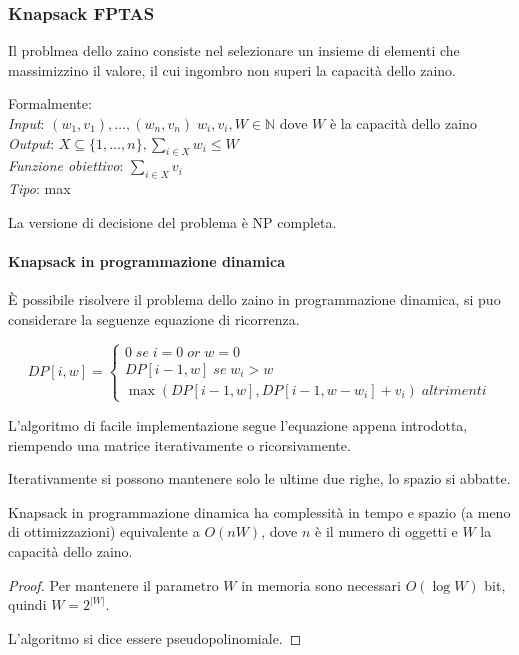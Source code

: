 \subsubsection{Knapsack FPTAS}
Il problmea dello zaino consiste nel selezionare un insieme 
di elementi che massimizzino il valore, il cui ingombro non superi
la capacità dello zaino.

Formalmente:\\
\emph{Input}: $(w_1, v_1), \dots, (w_n, v_n)\;w_i, v_i, W \in \mathbb{N}$ dove $W$ è la capacità dello zaino\\
\emph{Output}: $X \subseteq \{1, \dots, n\}, \sum_{i \in X} w_i \leq W$\\
\emph{Funzione obiettivo}: $\sum_{i \in X} v_i$\\
\emph{Tipo}: max

La versione di decisione del problema è NP completa.

\paragraph{Knapsack in programmazione dinamica}
È possibile risolvere il problema dello zaino in programmazione dinamica, 
si puo considerare la seguenze equazione di ricorrenza.

\[
    DP[i,w] = 
    \begin{cases}
        0\; \mathit{se}\; i = 0\;\mathit{or}\;w = 0\\
        DP[i-1,w]\;\mathit{se}\;w_i > w\\
        \max(DP[i-1,w], DP[i-1,w-w_i] + v_i)\;\mathit{altrimenti}

    \end{cases}\]

L'algoritmo di facile implementazione segue l'equazione appena introdotta, 
riempendo una matrice iterativamente o ricorsivamente.
\begin{remark}
    Iterativamente si possono mantenere solo le ultime due righe, 
    lo spazio si abbatte.
\end{remark}

\begin{theorem}
    Knapsack in programmazione dinamica ha complessità in tempo e spazio (a meno di ottimizzazioni) equivalente a 
    $O(nW)$, dove $n$ è il numero di oggetti e $W$ la capacità dello zaino.
\end{theorem}
\begin{proof}
    Per mantenere il parametro $W$ in memoria sono necessari $O(\log W)$ bit, quindi
    $W = 2 ^{|W|}$. 

    L'algoritmo si dice essere pseudopolinomiale.
\end{proof}

